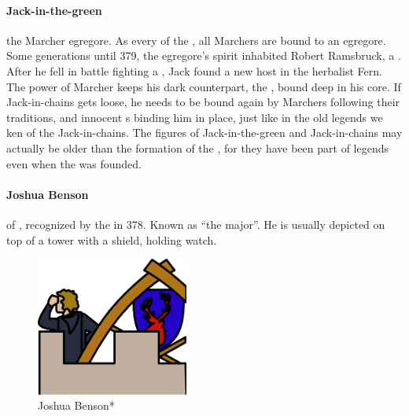 \paragraph{Jack-in-the-green} the Marcher egregore. As every  of the , all Marchers are bound to an egregore. Some generations until 379, the egregore's spirit inhabited Robert Ramsbruck, a . After he fell in battle fighting a , Jack found a new host in the herbalist Fern. The power of Marcher  keeps his dark counterpart, the , bound deep in his core. If Jack-in-chains gets loose, he needs to be bound again by Marchers following their traditions, and innocent s binding him in place, just like in the old legends we ken of the Jack-in-chains. The figures of Jack-in-the-green and Jack-in-chains may actually be older than the formation of the , for they have been part of legends even when the  was founded.
\paragraph{Joshua Benson}  of , recognized by the  in 378. Known as “the major”. He is usually depicted on top of a tower with a shield, holding watch.\begin{figure} \centering \includegraphics[width=5cm]{encyclopedia/Major} \caption{Joshua Benson*}\end{figure}
